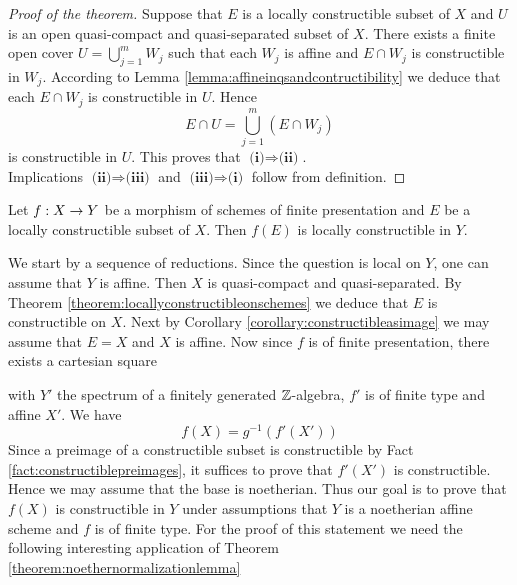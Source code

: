 \begin{proof}[Proof of the theorem]
Suppose that $E$ is a locally constructible subset of $X$ and $U$ is an open quasi-compact and quasi-separated subset of $X$. There exists a finite open cover $U = \bigcup_{j=1}^mW_j$ such that each $W_j$ is affine and $E\cap W_j$ is constructible in $W_j$. According to Lemma \ref{lemma:affineinqsandcontructibility} we deduce that each $E\cap W_j$ is constructible in $U$. Hence
$$E\cap U = \bigcup_{j=1}^m(E\cap W_j)$$
is constructible in $U$. This proves that $\textbf{(i)}\Rightarrow \textbf{(ii)}$.\\
Implications $\textbf{(ii)}\Rightarrow \textbf{(iii)}$ and $\textbf{(iii)}\Rightarrow \textbf{(i)}$ follow from definition.
\end{proof}

\begin{theorem}\label{theorem:chevalleysimagetheorem}
Let $f:X\rightarrow Y$ be a morphism of schemes of finite presentation and $E$ be a locally constructible subset of $X$. Then $f(E)$ is locally constructible in $Y$.
\end{theorem}
\noindent
We start by a sequence of reductions. Since the question is local on $Y$, one can assume that $Y$ is affine. Then $X$ is quasi-compact and quasi-separated. By Theorem \ref{theorem:locallyconstructibleonschemes} we deduce that $E$ is constructible on $X$. Next by Corollary \ref{corollary:constructibleasimage} we may assume that $E = X$ and $X$ is affine. Now since $f$ is of finite presentation, there exists a cartesian square
\begin{center}
\end{center}
with $Y'$ the spectrum of a finitely generated ${\mathbb Z}$-algebra, $f'$ is of finite type and affine $X'$. We have 
$$f(X) = g^{-1}\left(f'(X')\right)$$
Since a preimage of a constructible subset is constructible by Fact \ref{fact:constructiblepreimages}, it suffices to prove that $f'(X')$ is constructible. Hence we may assume that the base is noetherian. Thus our goal is to prove that $f(X)$ is constructible in $Y$ under assumptions that $Y$ is a noetherian affine scheme and $f$ is of finite type. For the proof of this statement we need the following interesting application of Theorem \ref{theorem:noethernormalizationlemma}

